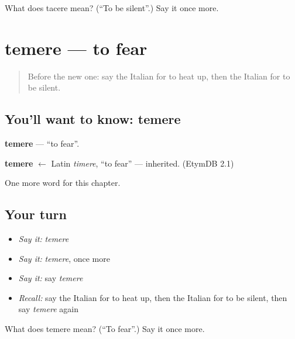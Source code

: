 \begin{tcolorbox}[breakable,colback=teal!4,colframe=teal!35!black,title={Before you move on}]
What does tacere mean? (\textquotedblleft{}To be silent\textquotedblright{}.) Say it once more.
\end{tcolorbox}
\section[temere]{temere — to fear}

\label{lesson:IT-C148-temere}



\begin{quote}
Before the new one: say the Italian for to heat up, then the Italian for to be silent.
\end{quote}

\subsection*{You'll want to know: temere}
\textbf{temere} — \textquotedblleft{}to fear\textquotedblright{}.

\begin{cousinweb}
\textbf{temere} $\leftarrow$ Latin \emph{timere}, \textquotedblleft{}to fear\textquotedblright{} — inherited. (EtymDB 2.1)
\end{cousinweb}

\begin{grammarlens}[title={What you've built}]
One more word for this chapter.
\end{grammarlens}

\subsection*{Your turn}
\begin{itemize}
\raggedright
  \item \emph{Say it:} \emph{temere}
  \item \emph{Say it:} \emph{temere}, once more
  \item \emph{Say it:} say \emph{temere}
  \item \emph{Recall:} say the Italian for to heat up, then the Italian for to be silent, then say \emph{temere} again
\end{itemize}

\begin{tcolorbox}[breakable,colback=teal!4,colframe=teal!35!black,title={Before you move on}]
What does temere mean? (\textquotedblleft{}To fear\textquotedblright{}.) Say it once more.
\end{tcolorbox}
